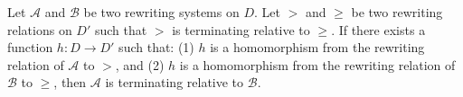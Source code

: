 \begin{definition}
    \label{def:rewriting_system:proving_relative_termination}
    Let \( \mathcal{A} \) and \( \mathcal{B} \) be two rewriting systems on $D$. Let $>$ and $\geq$ be two rewriting relations on $D'$ such that $>$ is terminating relative to $\geq$. If there exists a function $h : D \to D'$ such that: (1) $h$ is a homomorphism from the rewriting relation of \(\mathcal{A}\) to $>$, and (2) $h$ is a homomorphism from the rewriting relation of \(\mathcal{B}\) to $\geq$, then \(\mathcal{A}\) is terminating relative to \(\mathcal{B}\).
\end{definition}




